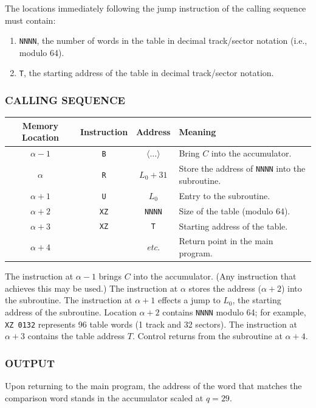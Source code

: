 The locations immediately following the jump instruction of the calling sequence must contain:
\begin{enumerate}
    \item \texttt{NNNN}, the number of words in the table in decimal track/sector notation (i.e., modulo 64).
    \item \texttt{T}, the starting address of the table in decimal track/sector notation.
\end{enumerate}

\subsubsection*{CALLING SEQUENCE}
\begin{table}[h!]
\centering
\begin{tabularx}{\textwidth}{cccX}
\toprule
\textbf{Memory Location} & \textbf{Instruction} & \textbf{Address} & \textbf{Meaning} \\
\midrule
$\alpha - 1$ & \texttt{B} & $\langle \dots \rangle$ & Bring $C$ into the accumulator. \\
$\alpha$     & \texttt{R} & $L_0 + 31$              & Store the address of \texttt{NNNN} into the subroutine. \\
$\alpha+1$         & \texttt{U} & $L_0$                   & Entry to the subroutine. \\
$\alpha+2$         & \texttt{XZ} & \texttt{NNNN}          & Size of the table (modulo 64). \\
$\alpha+3$         & \texttt{XZ} & \texttt{T}             & Starting address of the table. \\
$\alpha+4$         &            & \textit{etc.}           & Return point in the main program. \\
\bottomrule
\end{tabularx}
\end{table}

The instruction at $\alpha-1$ brings $C$ into the accumulator. (Any instruction that achieves this may be used.) The instruction at $\alpha$ stores the address ($\alpha+2$) into the subroutine. The instruction at $\alpha+1$ effects a jump to $L_0$, the starting address of the subroutine. Location $\alpha+2$ contains \texttt{NNNN} modulo 64; for example, \texttt{XZ 0132} represents 96 table words (1 track and 32 sectors). The instruction at $\alpha+3$ contains the table address $T$. Control returns from the subroutine at $\alpha+4$.

\subsubsection*{OUTPUT}
Upon returning to the main program, the address of the word that matches the comparison word stands in the accumulator scaled at $q = 29$.


